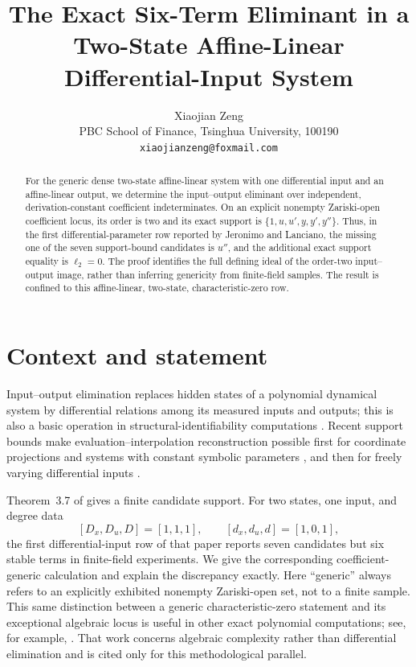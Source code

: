 \documentclass[11pt]{article}
\title{The Exact Six-Term Eliminant in a Two-State Affine-Linear Differential-Input System}
\author{Xiaojian Zeng\\
PBC School of Finance, Tsinghua University, 100190\\
\texttt{xiaojianzeng@foxmail.com}}
\date{}
\begin{document}
\maketitle

\begin{abstract}
For the generic dense two-state affine-linear system with one differential
input and an affine-linear output, we determine the input--output eliminant
over independent, derivation-constant coefficient indeterminates.  On an
explicit nonempty Zariski-open coefficient locus, its order is two and its
exact support is
\(\{1,u,u',y,y',y''\}\).  Thus, in the first differential-parameter row
reported by Jeronimo and Lanciano, the missing one of the seven support-bound
candidates is \(u''\), and the additional exact support equality is
\(\ell_2=0\).  The proof identifies the full defining ideal of the
order-two input--output image, rather than inferring genericity from
finite-field samples.  The result is confined to this affine-linear,
two-state, characteristic-zero row.
\end{abstract}

\section{Context and statement}

Input--output elimination replaces hidden states of a polynomial dynamical
system by differential relations among its measured inputs and outputs; this
is also a basic operation in structural-identifiability computations
\cite{DongEtAl2023}.  Recent support bounds make evaluation--interpolation
reconstruction possible first for coordinate projections and systems with
constant symbolic parameters \cite{MukhinaPogudin2025Projection,MukhinaPogudin2026},
and then for freely varying differential inputs \cite{JeronimoLanciano2026}.

Theorem~3.7 of \cite{JeronimoLanciano2026} gives a finite candidate support.
For two states, one input, and degree data
\[
 [D_x,D_u,D]=[1,1,1],\qquad [d_x,d_u,d]=[1,0,1],
\]
the first differential-input row of that paper reports seven candidates but
six stable terms in finite-field experiments.  We give the corresponding
coefficient-generic calculation and explain the discrepancy exactly.  Here
``generic'' always refers to an explicitly exhibited nonempty Zariski-open
set, not to a finite sample.  This same distinction between a generic
characteristic-zero statement and its exceptional algebraic locus is useful
in other exact polynomial computations; see, for example,
\cite{Zeng2026Bezout}.  That work concerns algebraic complexity rather than
differential elimination and is cited only for this methodological parallel.
\end{document}
